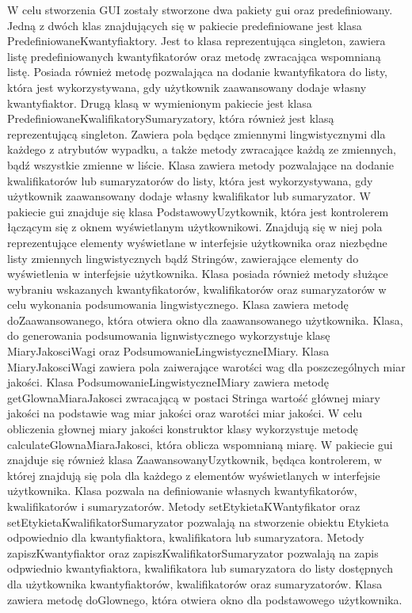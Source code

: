 \documentclass{classrep}
\begin{document}
W celu stworzenia GUI zostały stworzone dwa pakiety gui oraz predefiniowany. Jedną z dwóch klas znajdujących się w pakiecie predefiniowane jest klasa PredefiniowaneKwantyfiaktory. Jest to klasa reprezentująca singleton, zawiera listę predefiniowanych kwantyfikatorów oraz metodę zwracająca wspomnianą listę. Posiada również metodę pozwalająca na dodanie kwantyfikatora do listy, która jest wykorzystywana, gdy użytkownik zaawansowany dodaje własny kwantyfiaktor. Drugą klasą w wymienionym pakiecie jest klasa PredefiniowaneKwalifikatorySumaryzatory, która również jest klasą reprezentującą singleton. Zawiera pola będące zmiennymi lingwistycznymi dla każdego z atrybutów wypadku, a także metody zwracające każdą ze zmiennych, bądź wszystkie zmienne w liście. Klasa zawiera metody pozwalające na dodanie kwalifikatorów lub sumaryzatorów do listy, która jest wykorzystywana, gdy użytkownik zaawansowany dodaje własny kwalifikator lub sumaryzator. W pakiecie gui znajduje się klasa PodstawowyUzytkownik, która jest kontrolerem łączącym się z oknem wyświetlanym użytkownikowi. Znajdują się w niej pola reprezentujące elementy wyświetlane w interfejsie użytkownika oraz niezbędne listy zmiennych lingwistycznych bądź Stringów, zawierające elementy do wyświetlenia w interfejsie użytkownika. Klasa posiada również metody służące wybraniu wskazanych kwantyfikatorów, kwalifikatorów oraz sumaryzatorów w celu wykonania podsumowania lingwistycznego. Klasa zawiera metodę doZaawansowanego, która otwiera okno dla zaawansowanego użytkownika. Klasa, do generowania podsumowania lignwistycznego wykorzystuje klasę MiaryJakosciWagi oraz PodsumowanieLingwistyczneIMiary. Klasa MiaryJakosciWagi zawiera pola zaiwerające warotści wag dla poszczególnych miar jakości. Klasa 
PodsumowanieLingwistyczneIMiary zawiera metodę getGlownaMiaraJakosci zwracającą w postaci Stringa wartość głównej miary jakości na podstawie wag miar jakości oraz warotści miar jakości. W celu obliczenia głownej miary jakości konstruktor klasy wykorzystuje metodę calculateGlownaMiaraJakosci, która oblicza wspomnianą miarę. W pakiecie gui znajduje się również klasa ZaawansowanyUzytkownik, będąca kontrolerem, w której znajdują się pola dla każdego z elementów wyświetlanych w interfejsie użytkownika. Klasa pozwala na definiowanie własnych kwantyfikatorów, kwalifikatorów i sumaryzatorów. Metody setEtykietaKWantyfikator oraz setEtykietaKwalifikatorSumaryzator pozwalają na stworzenie obiektu Etykieta odpowiednio dla kwantyfiaktora, kwalifikatora lub sumaryzatora. Metody zapiszKwantyfiaktor oraz zapiszKwalifikatorSumaryzator pozwalają na zapis odpwiednio kwantyfiaktora, kwalifikatora lub sumaryzatora do listy dostępnych dla użytkownika kwantyfiaktorów, kwalifikatorów oraz sumaryzatorów. Klasa zawiera metodę doGlownego, która otwiera okno dla podstawowego użytkownika. 
\end{document}
